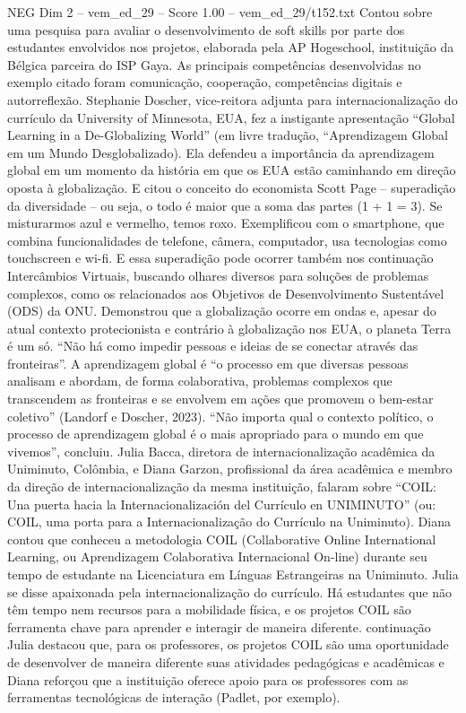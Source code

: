 \begin{textsample}{NEG Dim 2 – vem\_ed\_29 – Score 1.00 – vem\_ed\_29/t152.txt}
Contou sobre uma pesquisa para avaliar o desenvolvimento de soft skills por parte dos estudantes envolvidos nos projetos, elaborada pela AP Hogeschool, instituição da Bélgica parceira do ISP Gaya.
As principais competências desenvolvidas no exemplo citado foram comunicação, cooperação, competências digitais e autorreflexão.
Stephanie Doscher, vice-reitora adjunta para internacionalização do currículo da University of Minnesota, EUA, fez a instigante apresentação “Global Learning in a De-Globalizing World” (em livre tradução, “Aprendizagem Global em um Mundo Desglobalizado).
Ela defendeu a importância da aprendizagem global em um momento da história em que os EUA estão caminhando em direção oposta à globalização.
E citou o conceito do economista Scott Page – superadição da diversidade – ou seja, o todo é maior que a soma das partes (1 + 1 = 3).
Se misturarmos azul e vermelho, temos roxo.
Exemplificou com o smartphone, que combina funcionalidades de telefone, câmera, computador, usa tecnologias como touchscreen e wi-fi.
E essa superadição pode ocorrer também nos continuação Intercâmbios Virtuais, buscando olhares diversos para soluções de problemas complexos, como os relacionados aos Objetivos de Desenvolvimento Sustentável (ODS) da ONU.
Demonstrou que a globalização ocorre em ondas e, apesar do atual contexto protecionista e contrário à globalização nos EUA, o planeta Terra é um só. “Não há como impedir pessoas e ideias de se conectar através das fronteiras”.
A aprendizagem global é “o processo em que diversas pessoas analisam e abordam, de forma colaborativa, problemas complexos que transcendem as fronteiras e se envolvem em ações que promovem o bem-estar coletivo” (Landorf e Doscher, 2023). “Não importa qual o contexto político, o processo de aprendizagem global é o mais apropriado para o mundo em que vivemos”, concluiu.
Julia Bacca, diretora de internacionalização acadêmica da Uniminuto, Colômbia, e Diana Garzon, profissional da área acadêmica e membro da direção de internacionalização da mesma instituição, falaram sobre “COIL: Una puerta hacia la Internacionalización del Currículo en UNIMINUTO” (ou: COIL, uma porta para a Internacionalização do Currículo na Uniminuto).
Diana contou que conheceu a metodologia COIL (Collaborative Online International Learning, ou Aprendizagem Colaborativa Internacional On-line) durante seu tempo de estudante na Licenciatura em Línguas Estrangeiras na Uniminuto.
Julia se disse apaixonada pela internacionalização do currículo.
Há estudantes que não têm tempo nem recursos para a mobilidade física, e os projetos COIL são ferramenta chave para aprender e interagir de maneira diferente. continuação Julia destacou que, para os professores, os projetos COIL são uma oportunidade de desenvolver de maneira diferente suas atividades pedagógicas e acadêmicas e Diana reforçou que a instituição oferece apoio para os professores com as ferramentas tecnológicas de interação (Padlet, por exemplo).

\end{textsample}

